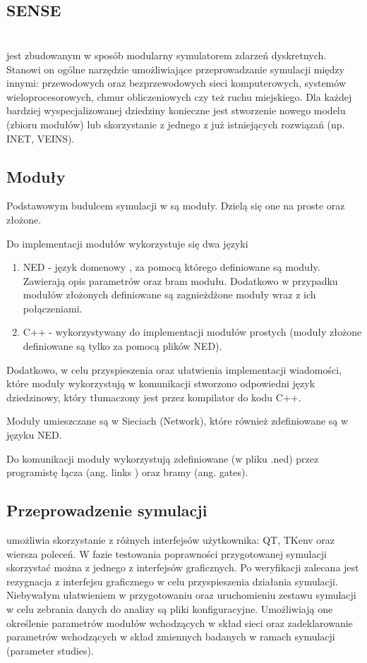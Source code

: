 \subsection{SENSE}
\section{\omnetpp}
\omnetpp jest zbudowanym w sposób modularny symulatorem zdarzeń dyskretnych. Stanowi on ogólne narzędzie umożliwiające przeprowadzanie symulacji między innymi: przewodowych oraz bezprzewodowych sieci komputerowych, systemów wieloprocesorowych, chmur obliczeniowych czy też ruchu miejskiego. Dla każdej bardziej wyspecjalizowanej dziedziny konieczne jest stworzenie nowego modelu (zbioru modułów) lub skorzystanie z jednego z już istniejących rozwiązań (np. INET, VEINS).\cite{Varga2017}
\subsection{Moduły}
Podstawowym budulcem symulacji w \omnetpp są moduły. Dzielą się one na proste oraz złożone.

Do implementacji modułów wykorzystuje się dwa języki
\begin{enumerate}
	\item NED - język domenowy \omnetpp, za pomocą którego definiowane są moduły. Zawierają opis parametrów oraz bram modułu. Dodatkowo w przypadku modułów złożonych definiowane są zagnieżdżone moduły wraz z ich połączeniami.
	\item C++ - wykorzystywany do implementacji modułów prostych (moduły złożone definiowane są tylko za pomocą plików NED).
\end{enumerate}
Dodatkowo, w celu przyspieszenia oraz ułatwienia implementacji wiadomości, które moduły wykorzystują w komunikacji stworzono odpowiedni język dziedzinowy, który tłumaczony jest przez kompilator do kodu C++.

Moduły umieszczane są w Sieciach (Network), które również zdefiniowane są w języku NED.

Do komunikacji moduły wykorzystują zdefiniowane (w pliku .ned) przez programistę łącza (ang. links ) oraz bramy (ang. gates).
\subsection{Przeprowadzenie symulacji}
\omnetpp umożliwia skorzystanie z różnych interfejsów użytkownika: QT, TKenv oraz wiersza poleceń. W fazie testowania poprawności przygotowanej symulacji skorzystać można z jednego z interfejsów graficznych. Po weryfikacji zalecana jest rezygnacja z interfejsu graficznego w celu przyspieszenia działania symulacji. Niebywałym ułatwieniem w przygotowaniu oraz uruchomieniu zestawu symulacji w celu zebrania danych do analizy są pliki konfiguracyjne. Umożliwiają one określenie parametrów modułów wchodzących w skład sieci oraz zadeklarowanie parametrów wchodzących w skład zmiennych badanych w ramach symulacji (parameter studies).
